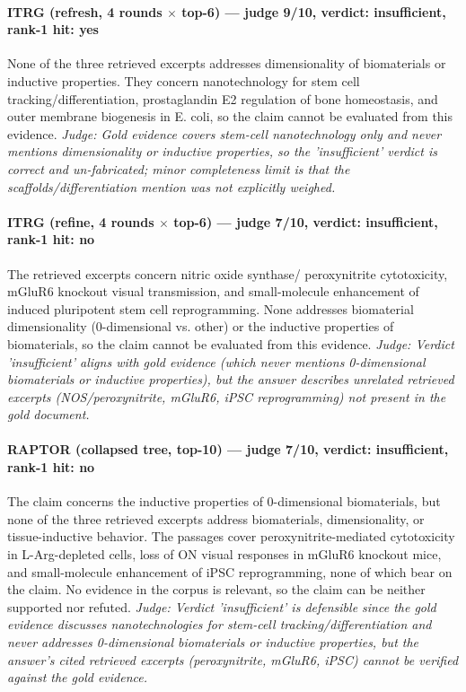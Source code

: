 \documentclass[sigconf, review, anonymous]{acmart}
\begin{document}
\paragraph{ITRG (refresh, 4 rounds $\times$ top-6) --- judge 9/10, verdict: insufficient, rank-1 hit: yes}
\noindent None of the three retrieved excerpts addresses dimensionality of biomaterials or inductive properties. They concern nanotechnology for stem cell tracking/differentiation, prostaglandin E2 regulation of bone homeostasis, and outer membrane biogenesis in E. coli, so the claim cannot be evaluated from this evidence.
\noindent\small\textit{Judge: Gold evidence covers stem-cell nanotechnology only and never mentions dimensionality or inductive properties, so the 'insufficient' verdict is correct and un-fabricated; minor completeness limit is that the scaffolds/differentiation mention was not explicitly weighed.}
\paragraph{ITRG (refine, 4 rounds $\times$ top-6) --- judge 7/10, verdict: insufficient, rank-1 hit: no}
\noindent The retrieved excerpts concern nitric oxide synthase/ peroxynitrite cytotoxicity, mGluR6 knockout visual transmission, and small-molecule enhancement of induced pluripotent stem cell reprogramming. None addresses biomaterial dimensionality (0-dimensional vs. other) or the inductive properties of biomaterials, so the claim cannot be evaluated from this evidence.
\noindent\small\textit{Judge: Verdict 'insufficient' aligns with gold evidence (which never mentions 0-dimensional biomaterials or inductive properties), but the answer describes unrelated retrieved excerpts (NOS/peroxynitrite, mGluR6, iPSC reprogramming) not present in the gold document.}
\paragraph{RAPTOR (collapsed tree, top-10) --- judge 7/10, verdict: insufficient, rank-1 hit: no}
\noindent The claim concerns the inductive properties of 0-dimensional biomaterials, but none of the three retrieved excerpts address biomaterials, dimensionality, or tissue-inductive behavior. The passages cover peroxynitrite-mediated cytotoxicity in L-Arg-depleted cells, loss of ON visual responses in mGluR6 knockout mice, and small-molecule enhancement of iPSC reprogramming, none of which bear on the claim. No evidence in the corpus is relevant, so the claim can be neither supported nor refuted.
\noindent\small\textit{Judge: Verdict 'insufficient' is defensible since the gold evidence discusses nanotechnologies for stem-cell tracking/differentiation and never addresses 0-dimensional biomaterials or inductive properties, but the answer's cited retrieved excerpts (peroxynitrite, mGluR6, iPSC) cannot be verified against the gold evidence.}
\end{document}
